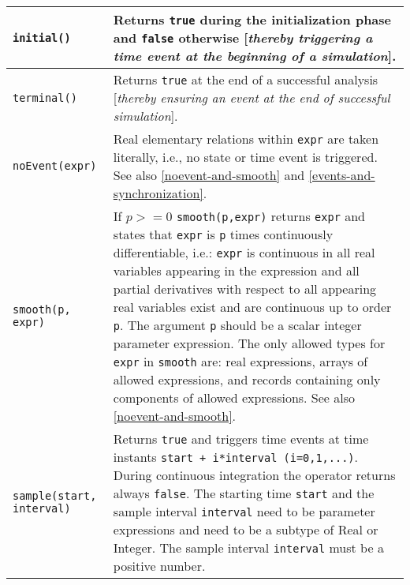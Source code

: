 \begin{longtable}{|p{5cm}|p{8cm}|} 
\hline \endhead

\lstinline[basicstyle=\ttfamily]!initial()! & Returns \lstinline[basicstyle=\ttfamily]!true! during the initialization phase and \lstinline[basicstyle=\ttfamily]!false!
otherwise {[}\emph{thereby triggering a time event at the beginning of a
simulation}{]}.\\ \hline

\lstinline[basicstyle=\ttfamily]!terminal()! & Returns \lstinline[basicstyle=\ttfamily]!true! at the end of a successful analysis
{[}\emph{thereby ensuring an event at the end of successful
simulation}{]}.\\ \hline

\lstinline[basicstyle=\ttfamily]!noEvent(expr)! & Real elementary relations within \lstinline[basicstyle=\ttfamily]!expr! are taken literally, i.e., no state or time event is triggered. See also \autoref{noevent-and-smooth} and \autoref{events-and-synchronization}.\\ \hline

\lstinline[basicstyle=\ttfamily]!smooth(p, expr)! & If $p>=0$ \lstinline[basicstyle=\ttfamily]!smooth(p,expr)!
returns \lstinline[basicstyle=\ttfamily]!expr! and states that \lstinline[basicstyle=\ttfamily]!expr! is \lstinline[basicstyle=\ttfamily]!p! times continuously
differentiable, i.e.: \lstinline[basicstyle=\ttfamily]!expr! is continuous in all real variables appearing
in the expression and all partial derivatives with respect to all
appearing real variables exist and are continuous up to order
\lstinline[basicstyle=\ttfamily]!p!. The argument \lstinline[basicstyle=\ttfamily]!p! should be a scalar integer parameter
expression. The only allowed types for \lstinline[basicstyle=\ttfamily]!expr! in \lstinline[basicstyle=\ttfamily]!smooth! are: real
expressions, arrays of allowed expressions, and records containing only
components of allowed expressions. See also \autoref{noevent-and-smooth}.\\ \hline

\lstinline[basicstyle=\ttfamily]!sample(start, interval)! & Returns \lstinline[basicstyle=\ttfamily]!true! and triggers time events at time
instants \lstinline[basicstyle=\ttfamily]!start + i*interval (i=0,1,...)!. During continuous integration
the operator returns always \lstinline[basicstyle=\ttfamily]!false!. The starting time \lstinline[basicstyle=\ttfamily]!start! and the
sample interval \lstinline[basicstyle=\ttfamily]!interval! need to be parameter expressions and need to be
a subtype of Real or Integer. The sample interval \lstinline[basicstyle=\ttfamily]!interval! must be a
positive number.\\ \hline


\end{longtable}
